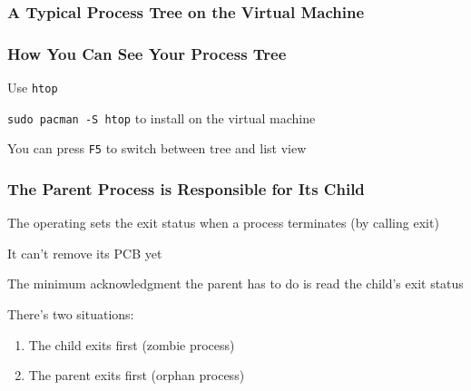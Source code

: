   \begin{frame}
    \frametitle{A Typical Process Tree on the Virtual Machine}

  \end{frame}

  \begin{frame}
    \frametitle{How You Can See Your Process Tree}

    Use \texttt{htop}

    \hspace{2em} \texttt{sudo pacman -S htop} to install on the virtual machine

    \vspace{2em}

    You can press \texttt{F5} to switch between tree and list view
  \end{frame}

  \begin{frame}
    \frametitle{The Parent Process is Responsible for Its Child}

    The operating sets the exit status when a process terminates (by calling exit)

    \hspace{2em} It can't remove its PCB yet

    \vspace{2em}

    The minimum acknowledgment the parent has to do is read the child's exit status

    \vspace{2em}

    There's two situations:
    \begin{enumerate}
      \item The child exits first (zombie process)
      \item The parent exits first (orphan process)
    \end{enumerate}
  \end{frame}


